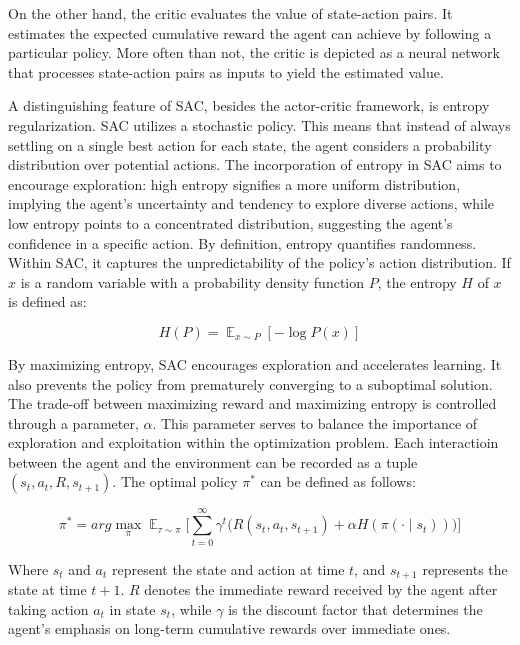 On the other hand, the critic evaluates the value of state-action pairs. It estimates the expected cumulative reward the agent can achieve by following a particular policy. More often than not, the critic is depicted as a neural network that processes state-action pairs as inputs to yield the estimated value.

A distinguishing feature of SAC, besides the actor-critic framework, is entropy regularization\cite{achiam2018spinning}. SAC utilizes a stochastic policy. This means that instead of always settling on a single best action for each state, the agent considers a probability distribution over potential actions. The incorporation of entropy in SAC aims to encourage exploration: high entropy signifies a more uniform distribution, implying the agent's uncertainty and tendency to explore diverse actions, while low entropy points to a concentrated distribution, suggesting the agent's confidence in a specific action. By definition, entropy quantifies randomness. Within SAC, it captures the unpredictability of the policy's action distribution. If
\(x\) is a random variable with a probability density function \(P\), the
entropy \(H\) of \(x\) is defined as:

\begin{equation}
 H(P) = \displaystyle \mathop{\mathbb{E}}_{x \sim P}[-\log P(x)]
\end{equation}

By maximizing entropy, SAC encourages exploration and accelerates learning. It
also prevents the policy from prematurely converging to a suboptimal solution.
The trade-off between maximizing reward and maximizing entropy is controlled
through a parameter, \(\alpha\). This parameter serves to balance the importance
of exploration and exploitation within the optimization problem. Each interactioin between the agent and the environment can be recorded as a tuple \((s_t,a_t,R,s_{t+1})\). The optimal policy
\(\pi^*\) can be defined as follows:

\begin{equation}
 \pi^* = {arg}{\max_{\pi}}{\displaystyle
 \mathop{\mathbb{E}}_{\tau\sim\pi}}{\Bigg[{\sum_{t=0}^{\infty}}{\gamma^{t}}{\Big(R(s_t,a_t,s_{t+1})}+{\alpha}H(\pi(\cdot\mid{s_t}))\Big)\Bigg]}
\end{equation}

Where \(s_t\) and \(a_t\) represent the state and action at time \(t\), and \(s_{t+1}\) represents the state at time \(t+1\). \(R\) denotes the immediate reward received by the agent after taking action \(a_t\) in state \(s_t\), while \(\gamma\) is the discount factor that determines the agent's emphasis on long-term cumulative rewards over immediate ones.


